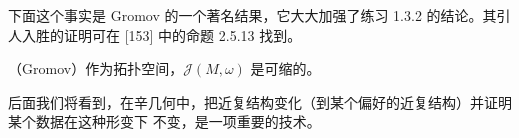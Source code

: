 下面这个事实是 Gromov 的一个著名结果，它大大加强了练习 1.3.2 的结论。其引人入胜的证明可在
[153] 中的命题 2.5.13 找到。

（Gromov）\quad 作为拓扑空间，$\mathcal{J}(M,\omega)$ 是可缩的。

后面我们将看到，在辛几何中，把近复结构变化（到某个偏好的近复结构）并证明某个数据在这种形变下
不变，是一项重要的技术。
